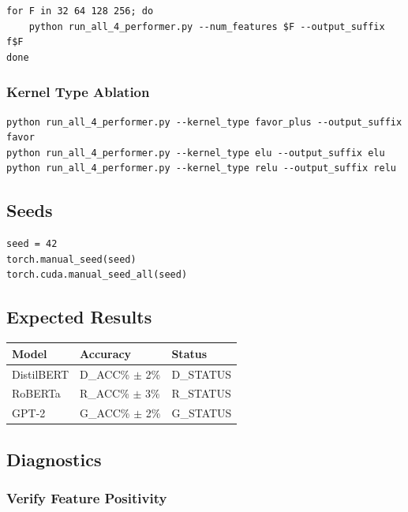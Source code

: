 \begin{lstlisting}
for F in 32 64 128 256; do
    python run_all_4_performer.py --num_features $F --output_suffix f$F
done
\end{lstlisting}

\subsubsection{Kernel Type Ablation}

\begin{lstlisting}
python run_all_4_performer.py --kernel_type favor_plus --output_suffix favor
python run_all_4_performer.py --kernel_type elu --output_suffix elu
python run_all_4_performer.py --kernel_type relu --output_suffix relu
\end{lstlisting}

\subsection{Seeds}

\begin{lstlisting}
seed = 42
torch.manual_seed(seed)
torch.cuda.manual_seed_all(seed)
\end{lstlisting}

\subsection{Expected Results}

\begin{table}[H]
\centering
\small
\begin{tabular}{lll}
\toprule
\textbf{Model} & \textbf{Accuracy} & \textbf{Status} \\
\midrule
DistilBERT & {{D\_ACC}}\% $\pm$ 2\% & {{D\_STATUS}} \\
RoBERTa & {{R\_ACC}}\% $\pm$ 3\% & {{R\_STATUS}} \\
GPT-2 & {{G\_ACC}}\% $\pm$ 2\% & {{G\_STATUS}} \\
\bottomrule
\end{tabular}
\end{table}

\subsection{Diagnostics}

\subsubsection{Verify Feature Positivity}

